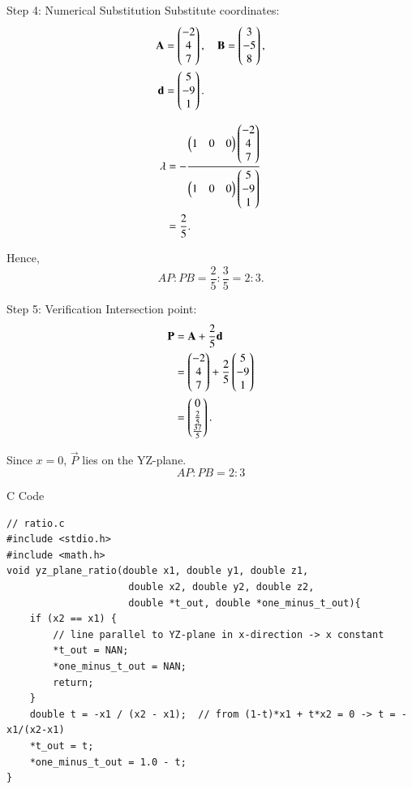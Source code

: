\documentclass{beamer}
\begin{document}
\begin{frame}{Step 4: Numerical Substitution}
Substitute coordinates:
\begin{align}
\mathbf{A} &= \begin{pmatrix}-2 \\ 4 \\ 7\end{pmatrix}, \quad
\mathbf{B} = \begin{pmatrix}3 \\ -5 \\ 8\end{pmatrix}, \\
\mathbf{d} &= \begin{pmatrix}5 \\ -9 \\ 1\end{pmatrix}.
\end{align}

\begin{align}
\lambda &= -\frac{\begin{pmatrix}1 & 0 & 0\end{pmatrix}\begin{pmatrix}-2 \\ 4 \\ 7\end{pmatrix}}
{\begin{pmatrix}1 & 0 & 0\end{pmatrix}\begin{pmatrix}5 \\ -9 \\ 1\end{pmatrix}} \\
&= \frac{2}{5}.
\end{align}

Hence,
\[
AP : PB = \frac{2}{5} : \frac{3}{5} = 2:3.
\]
\end{frame}

\begin{frame}{Step 5: Verification}
Intersection point:
\begin{align}
\mathbf{P} &= \mathbf{A} + \frac{2}{5}\mathbf{d} \\
&= \begin{pmatrix}-2 \\ 4 \\ 7\end{pmatrix} + \frac{2}{5}\begin{pmatrix}5 \\ -9 \\ 1\end{pmatrix} \\
&= \begin{pmatrix}0 \\ \tfrac{2}{5} \\ \tfrac{37}{5}\end{pmatrix}.
\end{align}

Since $x=0$, $\vec{P}$ lies on the YZ-plane.  
\[
\boxed{AP:PB = 2:3}
\]
\end{frame}





\begin{frame}[fragile]{C Code}
\begin{lstlisting}
// ratio.c
#include <stdio.h>
#include <math.h>
void yz_plane_ratio(double x1, double y1, double z1,
                     double x2, double y2, double z2,
                     double *t_out, double *one_minus_t_out){
    if (x2 == x1) {
        // line parallel to YZ-plane in x-direction -> x constant
        *t_out = NAN;
        *one_minus_t_out = NAN;
        return;
    }
    double t = -x1 / (x2 - x1);  // from (1-t)*x1 + t*x2 = 0 -> t = -x1/(x2-x1)
    *t_out = t;
    *one_minus_t_out = 1.0 - t;
}
  \end{lstlisting}
\end{frame}
\end{document}
